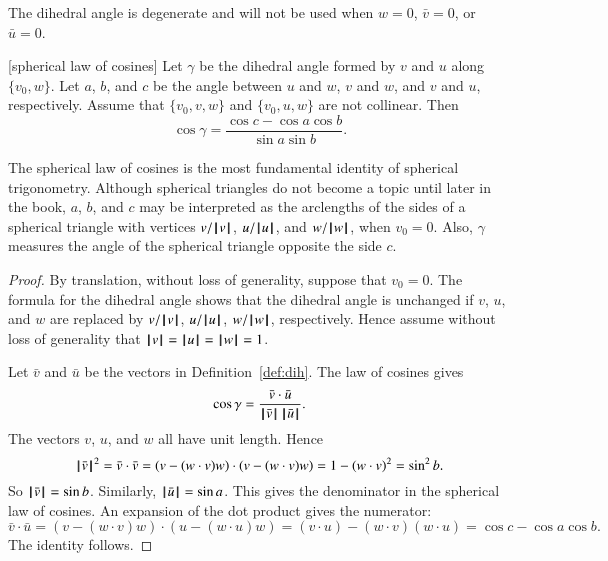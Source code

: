 The dihedral angle is degenerate and will not be used when $w =
0$, $\bar v = 0$, or $\bar u = 0$.




\begin{lemma}[spherical law of cosines]\label{lemma:sloc}
Let $\gamma$ be the dihedral angle formed by $v$ and $u$ along
$\{v_0,w\}$.  Let $a$, $b$, and $c$ be the
angle between $u$ and $w$, $v$ and $w$, and $v$ and
$u$, respectively. %
Assume that $\{v_0,v,w\}$ and $\{v_0,u,w\}$ are not collinear.
Then
    $$\cos\gamma = \frac{\cos c - \cos a \cos b}{\sin a\sin b}.$$
\end{lemma}

The spherical law of cosines is the most fundamental identity of spherical trigonometry.    Although  spherical
triangles do not become a topic until later in the book, $a$, $b$, and $c$ may be interpreted as
the arclengths of the sides of a spherical triangle with
vertices $v/{{\hskip0.1em|\hskip-0.15em|\hskip0.1em}v{\hskip0.1em|\hskip-0.15em|\hskip0.1em}}$, $u/{{\hskip0.1em|\hskip-0.15em|\hskip0.1em}u{\hskip0.1em|\hskip-0.15em|\hskip0.1em}}$, and $w/{{\hskip0.1em|\hskip-0.15em|\hskip0.1em}w{\hskip0.1em|\hskip-0.15em|\hskip0.1em}}$,  when $v_0=0$.  Also,
$\gamma$ measures the angle of the spherical triangle opposite the
side $c$.


\begin{proof}  By translation, without loss of generality, suppose that $v_0=0$.  
The formula for the dihedral angle shows that the
dihedral angle is unchanged if $v$, $u$, and $w$ are replaced
by $v/{{\hskip0.1em|\hskip-0.15em|\hskip0.1em}v{\hskip0.1em|\hskip-0.15em|\hskip0.1em}}$, $u/{{\hskip0.1em|\hskip-0.15em|\hskip0.1em}u{\hskip0.1em|\hskip-0.15em|\hskip0.1em}}$, $w/{{\hskip0.1em|\hskip-0.15em|\hskip0.1em}w{\hskip0.1em|\hskip-0.15em|\hskip0.1em}}$, respectively.  Hence assume without
loss of generality that ${{\hskip0.1em|\hskip-0.15em|\hskip0.1em}v{\hskip0.1em|\hskip-0.15em|\hskip0.1em}}={{\hskip0.1em|\hskip-0.15em|\hskip0.1em}u{\hskip0.1em|\hskip-0.15em|\hskip0.1em}}={{\hskip0.1em|\hskip-0.15em|\hskip0.1em}w{\hskip0.1em|\hskip-0.15em|\hskip0.1em}}=1$.

Let $\bar v$ and $\bar u$ be the vectors in Definition~\ref{def:dih}.
The law of cosines gives
        $$\cos\gamma = \frac{\bar v\cdot \bar u}{{{\hskip0.1em|\hskip-0.15em|\hskip0.1em}\bar v{\hskip0.1em|\hskip-0.15em|\hskip0.1em}}\,{{\hskip0.1em|\hskip-0.15em|\hskip0.1em}\bar u{\hskip0.1em|\hskip-0.15em|\hskip0.1em}}}.$$
The vectors $v$, $u$, and $w$ all have unit length.  Hence
        $$
        {{\hskip0.1em|\hskip-0.15em|\hskip0.1em}\bar v{\hskip0.1em|\hskip-0.15em|\hskip0.1em}}^2 = \bar v\cdot \bar v =
        (v - (w\cdot v)w)\cdot (v - (w\cdot v) w) =
        1 - (w\cdot v)^2 = \sin^2 b.
        $$
So ${{\hskip0.1em|\hskip-0.15em|\hskip0.1em}\bar v{\hskip0.1em|\hskip-0.15em|\hskip0.1em}} =\sin b$. Similarly, ${{\hskip0.1em|\hskip-0.15em|\hskip0.1em}\bar u{\hskip0.1em|\hskip-0.15em|\hskip0.1em}} = \sin a$.  This gives
the denominator in the spherical law of cosines.  An expansion of the dot product
gives the numerator:
    $$
    \bar v\cdot \bar u = (v - (w\cdot v) w)\cdot (u - (w\cdot u) w)
    = (v\cdot u) - (w\cdot v) (w\cdot u) = \cos c - \cos
    a \cos b.
    $$
The identity follows.
\end{proof}

